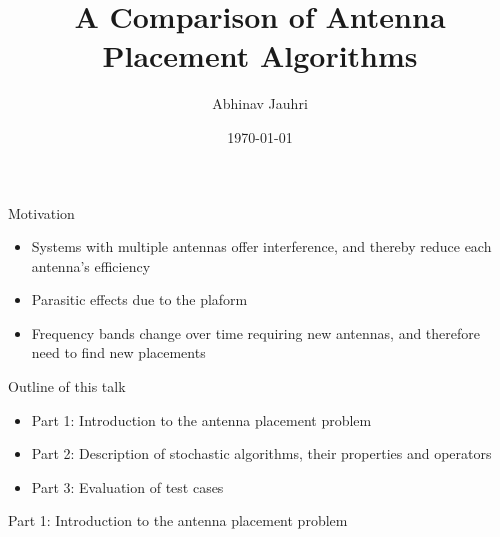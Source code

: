 \documentclass{beamer}
\title{\color{univred} A Comparison of Antenna Placement Algorithms}
\author{Abhinav Jauhri}
\date{\today}
\begin{document}
\begin{frame}
    \color{univred}
    \titlepage
\end{frame}

\begin{frame}{Motivation}
\begin{itemize} \itemsep1.5em
        \item Systems with multiple antennas offer interference, and thereby reduce each antenna's efficiency
        \item Parasitic effects due to the plaform 
        \item Frequency bands change over time requiring new antennas, and therefore need to find new placements
    \end{itemize}
    \vspace{5mm}
\end{frame}

\begin{frame}{Outline of this talk}
    \begin{itemize}
        \setlength\itemsep{2em}
        \item Part 1: Introduction to the antenna placement problem
        \item Part 2: Description of stochastic algorithms, their properties and operators
        \item Part 3: Evaluation of test cases
    \end{itemize}
\end{frame}

\begin{frame}{\null}
    \begin{tcolorbox}[colback=green!5]
        \centering\Huge
        Part 1: Introduction to the antenna placement problem
    \end{tcolorbox}
\end{frame}
\end{document}
